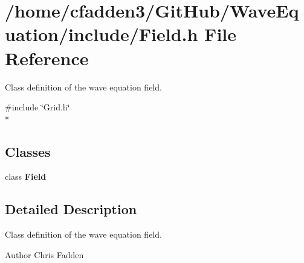 \section{/home/cfadden3/\+Git\+Hub/\+Wave\+Equation/include/\+Field.h File Reference}
\label{_field_8h}


Class definition of the wave equation field.  


{\ttfamily \#include \char`\"{}Grid.\+h\char`\"{}}\\*
\subsection*{Classes}
\begin{DoxyCompactItemize}
\item 
class {\bf Field}
\end{DoxyCompactItemize}


\subsection{Detailed Description}
Class definition of the wave equation field. 

\begin{DoxyAuthor}{Author}
Chris Fadden 
\end{DoxyAuthor}
